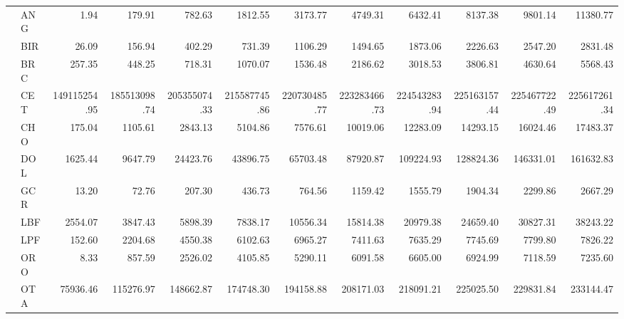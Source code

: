 \documentclass[11pt]{article}
\begin{document}
\begin{table}[htb]
\begin{center}
\begin{tabular}{llrrrrrrrrrr}
                             &  ANG  &               1.94  &        179.91  &        782.63  &       1812.55  &       3173.77  &       4749.31  &       6432.41  &       8137.38  &       9801.14  &      11380.77  \\
                             &  BIR  &              26.09  &        156.94  &        402.29  &        731.39  &       1106.29  &       1494.65  &       1873.06  &       2226.63  &       2547.20  &       2831.48  \\
                             &  BRC  &             257.35  &        448.25  &        718.31  &       1070.07  &       1536.48  &       2186.62  &       3018.53  &       3806.81  &       4630.64  &       5568.43  \\
                             &  CET  &       149115254.95  &  185513098.74  &  205355074.33  &  215587745.86  &  220730485.77  &  223283466.73  &  224543283.94  &  225163157.44  &  225467722.49  &  225617261.34  \\
                             &  CHO  &             175.04  &       1105.61  &       2843.13  &       5104.86  &       7576.61  &      10019.06  &      12283.09  &      14293.15  &      16024.46  &      17483.37  \\
                             &  DOL  &            1625.44  &       9647.79  &      24423.76  &      43896.75  &      65703.48  &      87920.87  &     109224.93  &     128824.36  &     146331.01  &     161632.83  \\
                             &  GCR  &              13.20  &         72.76  &        207.30  &        436.73  &        764.56  &       1159.42  &       1555.79  &       1904.34  &       2299.86  &       2667.29  \\
                             &  LBF  &            2554.07  &       3847.43  &       5898.39  &       7838.17  &      10556.34  &      15814.38  &      20979.38  &      24659.40  &      30827.31  &      38243.22  \\
                             &  LPF  &             152.60  &       2204.68  &       4550.38  &       6102.63  &       6965.27  &       7411.63  &       7635.29  &       7745.69  &       7799.80  &       7826.22  \\
                             &  ORO  &               8.33  &        857.59  &       2526.02  &       4105.85  &       5290.11  &       6091.58  &       6605.00  &       6924.99  &       7118.59  &       7235.60  \\
                             &  OTA  &           75936.46  &     115276.97  &     148662.87  &     174748.30  &     194158.88  &     208171.03  &     218091.21  &     225025.50  &     229831.84  &     233144.47  \\

\end{tabular}
\end{center}
\end{table}
\end{document}
